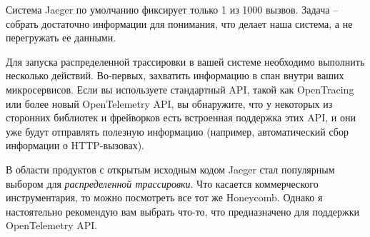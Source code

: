 \documentclass[%
	11pt,
	a4paper,
	utf8,
		]{article}
\begin{document}
Система Jaeger по умолчанию фиксирует только 1 из 1000 вызвов. Задача -- собрать достаточно информации для понимания, что делает наша система, а не перегружать ее данными.

Для запуска распределенной трассировки в вашей системе необходимо выполнить несколько действий. Во-первых, захватить информацию в спан внутри ваших микросервисов. Если вы используете стандартный API, такой как OpenTracing или более новый OpenTelemetry API, вы обнаружите, что у некоторых из сторонних библиотек и фрейворков есть встроенная поддержка этих API, и они уже будут отправлять полезную информацию (например, автоматический сбор информации о HTTP-вызовах). 

В области продуктов с открытым исходным кодом Jaeger стал популярным выбором для \emph{распределенной трассировки}. Что касается коммерческого инструментария, то можно посмотреть все тот же Honeycomb. Однако я настоятельно рекомендую вам выбрать что-то, что предназначено для поддержки OpenTelemetry API. 









\begin{thebibliography}{99}
	
	
\end{thebibliography}


\end{document}

